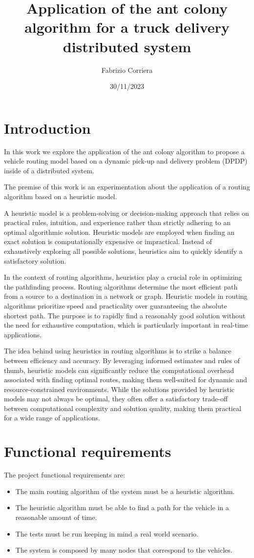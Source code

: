 \documentclass[titlepage]{article}
\title{Application of the ant colony algorithm for a truck delivery distributed system}
\author{Fabrizio Corriera}
\date{30/11/2023}
\begin{document}
\maketitle

\tableofcontents
\newpage
{}

\section{Introduction}
In this work we explore the application of the ant colony algorithm to propose a vehicle routing model based on a dynamic pick-up and delivery problem (DPDP) inside of a distributed system.

The premise of this work is an experimentation about the application of a routing algorithm based on a heuristic model.

A heuristic model is a problem-solving or decision-making approach that relies on practical rules, intuition, and experience rather than strictly adhering to an optimal algorithmic solution. Heuristic models are employed when finding an exact solution is computationally expensive or impractical. Instead of exhaustively exploring all possible solutions, heuristics aim to quickly identify a satisfactory solution.

In the context of routing algorithms, heuristics play a crucial role in optimizing the pathfinding process. Routing algorithms determine the most efficient path from a source to a destination in a network or graph. Heuristic models in routing algorithms prioritize speed and practicality over guaranteeing the absolute shortest path. The purpose is to rapidly find a reasonably good solution without the need for exhaustive computation, which is particularly important in real-time applications.

The idea behind using heuristics in routing algorithms is to strike a balance between efficiency and accuracy. By leveraging informed estimates and rules of thumb, heuristic models can significantly reduce the computational overhead associated with finding optimal routes, making them well-suited for dynamic and resource-constrained environments. While the solutions provided by heuristic models may not always be optimal, they often offer a satisfactory trade-off between computational complexity and solution quality, making them practical for a wide range of applications.

\section{Functional requirements}
The project functional requirements are:
\begin{itemize}
    \item The main routing algorithm of the system must be a heuristic algorithm.
    \item The heuristic algorithm must be able to find a path for the vehicle in a reasonable amount of time.
    \item The tests must be run keeping in mind a real world scenario.
    \item The system is composed by many nodes that correspond to the vehicles.
\end{itemize}
\end{document}
